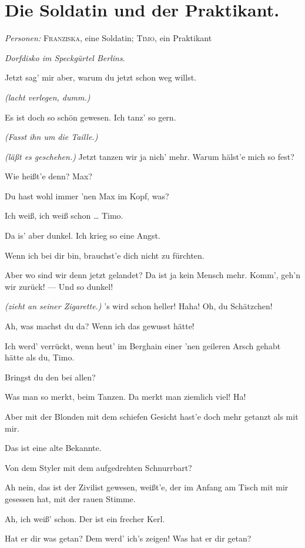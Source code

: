 \documentclass[
	final,
	a4paper,
	ngerman,
	mpinclude = true, %
	twoside = true,
	open = right,
	cleardoublepage = plain,
	DIV = 13,
	BCOR = 1cm,
	titlepage = firstiscover,
	]{scrbook}
\newcommand{\scene}{\section}
\newcommand{\direction}[1]{\textit{(#1)}}
\newcommand{\setting}[1]{\vspace{-0.5\baselineskip}\centering\textit{#1}}
\newcommand{\characterlist}[1]{{\begin{center}\textit{Personen:} #1\end{center}}}
\newcommand{\thecharacter}[1]{\textup{\textsc{#1}}\xspace}
\newcommand{\thesoldatin}{\thecharacter{Franziska}}
\newcommand{\thepraktikant}{\thecharacter{Timo}}
\newcommand{\character}[1]{\item[#1:]}
\newcommand{\soldatin}{\character{\thesoldatin}}
\newcommand{\praktikant}{\character{\thepraktikant}}
\begin{document}
\scene{Die Soldatin und der Praktikant.}
\characterlist{\thesoldatin, eine Soldatin; \thepraktikant, ein Praktikant}
\setting{Dorfdisko im Speckgürtel Berlins.}
\begin{play}
	\praktikant
	Jetzt sag' mir aber, warum du jetzt schon weg willst.

	\soldatin
	\direction{lacht verlegen, dumm.}

	\praktikant
	Es ist doch so schön gewesen. Ich tanz' so gern.

	\soldatin
	\direction{Fasst ihn um die Taille.}

	\praktikant
	\direction{läßt es geschehen.} Jetzt tanzen wir ja nich' mehr. Warum hälst'e mich so fest?

	\soldatin
	Wie heißt'e denn? Max?

	\praktikant
	Du hast wohl immer 'nen Max im Kopf, was?

	\soldatin
	Ich weiß, ich weiß schon \ldots{} Timo.

	\praktikant
	Da is' aber dunkel. Ich krieg so eine Angst.

	\soldatin
	Wenn ich bei dir bin, brauchst'e dich nicht zu fürchten.

	\praktikant
	Aber wo sind wir denn jetzt gelandet? Da ist ja kein Mensch mehr. Komm', geh'n wir zurück! --- Und so dunkel!

	\soldatin
	\direction{zieht an seiner Zigarette.} 's wird schon heller! Haha! Oh, du Schätzchen!

	\praktikant
	Ah, was machst du da? Wenn ich das gewusst hätte!

	\soldatin
	Ich werd' verrückt, wenn heut' im Berghain einer 'nen geileren Arsch gehabt hätte als du, Timo.

	\praktikant
	Bringst du den bei allen?

	\soldatin
	Was man so merkt, beim Tanzen. Da merkt man ziemlich viel! Ha!

	\praktikant
	Aber mit der Blonden mit dem schiefen Gesicht hast'e doch mehr getanzt als mit mir.

	\soldatin
	Das ist eine alte Bekannte.

	\praktikant
	Von dem Styler mit dem aufgedrehten Schnurrbart?

	\soldatin
	Ah nein, das ist der Zivilist gewesen, weißt'e, der im Anfang am Tisch mit mir gesessen hat, mit der rauen Stimme.

	\praktikant
	Ah, ich weiß' schon. Der ist ein frecher Kerl.

	\soldatin
	Hat er dir was getan? Dem werd' ich's zeigen! Was hat er dir getan?


\end{play}
\end{document}
